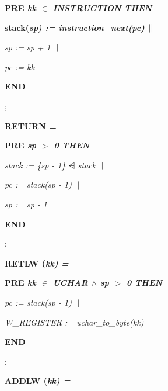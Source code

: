\begin{sloppypar}
\hspace*{0.40in}\bf PRE \it kk  $\in$  \it INSTRUCTION \bf THEN

\hspace*{0.60in}\bf stack\rm (\it sp\rm ) \rm := \it instruction\_next\rm (\it pc\rm )  $\mbox{$\mid\mid$}$ 

\hspace*{0.60in}\it sp \rm := \it sp \rm + \rm 1  $\mbox{$\mid\mid$}$ 

\hspace*{0.60in}\it pc \rm := \it kk

\hspace*{0.40in}\bf END

\hspace*{0.20in}\rm ;

\hspace*{0.20in}\bf RETURN \rm =

\hspace*{0.40in}\bf PRE \it sp $>$ \rm 0 \bf THEN

\hspace*{0.60in}\it stack \rm := \rm \{\it sp \rm - \rm 1\rm \}  $\ndres$  \it stack  $\mbox{$\mid\mid$}$ 

\hspace*{0.60in}\it pc \rm := \it stack\rm (\it sp \rm - \rm 1\rm )  $\mbox{$\mid\mid$}$ 

\hspace*{0.60in}\it sp \rm := \it sp \rm - \rm 1

\hspace*{0.40in}\bf END

\hspace*{0.20in}\rm ;

\hspace*{0.20in}\bf RETLW \rm (\it kk\rm ) \rm =

\hspace*{0.40in}\bf PRE \it kk  $\in$  \it UCHAR  $\land$  \it sp $>$ \rm 0 \bf THEN

\hspace*{0.60in}\it pc \rm := \it stack\rm (\it sp \rm - \rm 1\rm )  $\mbox{$\mid\mid$}$ 

\hspace*{0.60in}\it W\_REGISTER \rm := \it uchar\_to\_byte\rm (\it kk\rm )

\hspace*{0.40in}\bf END

\hspace*{0.20in}\rm ;

\hspace*{0.20in}\bf ADDLW \rm (\it kk\rm ) \rm =


\end{sloppypar}
